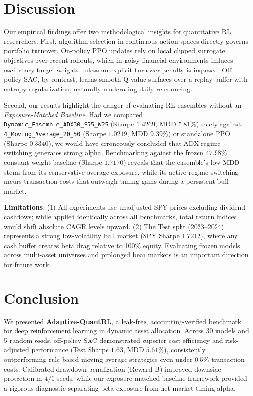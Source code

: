 \documentclass[10pt,twocolumn,conference]{IEEEtran}
\begin{document}
\section{Discussion}
Our empirical findings offer two methodological insights for quantitative RL researchers. First, algorithm selection in continuous action spaces directly governs portfolio turnover. On-policy PPO updates rely on local clipped surrogate objectives over recent rollouts, which in noisy financial environments induces oscillatory target weights unless an explicit turnover penalty is imposed. Off-policy SAC, by contrast, learns smooth Q-value surfaces over a replay buffer with entropy regularization, naturally moderating daily rebalancing.

Second, our results highlight the danger of evaluating RL ensembles without an \emph{Exposure-Matched Baseline}. Had we compared \texttt{Dynamic\_Ensemble\_ADX30\_S75\_W25} (Sharpe $1.4269$, MDD $5.81\%$) solely against \texttt{4\_Moving\_Average\_20\_50} (Sharpe $1.0219$, MDD $9.39\%$) or standalone PPO (Sharpe $0.3340$), we would have erroneously concluded that ADX regime switching generates strong alpha. Benchmarking against the frozen $47.98\%$ constant-weight baseline (Sharpe $1.7170$) reveals that the ensemble's low MDD stems from its conservative average exposure, while its active regime switching incurs transaction costs that outweigh timing gains during a persistent bull market.

\textbf{Limitations}: (1) All experiments use unadjusted SPY prices excluding dividend cashflows; while applied identically across all benchmarks, total return indices would shift absolute CAGR levels upward. (2) The Test split (2023--2024) represents a strong low-volatility bull market (SPY Sharpe $1.7212$), where any cash buffer creates beta drag relative to 100\% equity. Evaluating frozen models across multi-asset universes and prolonged bear markets is an important direction for future work.

\section{Conclusion}
We presented \textbf{Adaptive-QuantRL}, a leak-free, accounting-verified benchmark for deep reinforcement learning in dynamic asset allocation. Across 30 models and 5 random seeds, off-policy SAC demonstrated superior cost efficiency and risk-adjusted performance (Test Sharpe $1.63$, MDD $5.61\%$), consistently outperforming rule-based moving average strategies even under $0.5\%$ transaction costs. Calibrated drawdown penalization (Reward B) improved downside protection in $4/5$ seeds, while our exposure-matched baseline framework provided a rigorous diagnostic separating beta exposure from net market-timing alpha.
\end{document}
